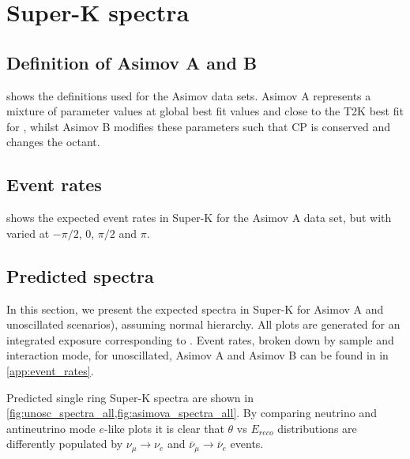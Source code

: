 \section {Super-K spectra}
\label{sec:spectra}

\subsection{Definition of Asimov A and B}
\label{sec:asimov_definition}
 shows the definitions used for the Asimov data sets. Asimov A represents a mixture of parameter values at global best fit values and close to the T2K best fit for \PrevRunPeriod, whilst Asimov B modifies these parameters such that CP is conserved and changes the \ssqthtwothree octant.


\subsection{Event rates}
\label{sec:event_rates}
 shows the expected event rates in Super-K for the Asimov A data set, but with \deltacp varied at $-\pi/2$, 0, $\pi/2$ and $\pi$.


\subsection{Predicted spectra}
\label{sec:selection:predicted_spectra}

In this section, we present the expected spectra in Super-K for Asimov A and unoscillated scenarios), assuming normal hierarchy. All plots are generated for an integrated exposure corresponding to \RunPeriod. Event rates, broken down by sample and interaction mode, for unoscillated, Asimov A and Asimov B can be found in  in \cref{app:event_rates}.

Predicted single ring Super-K spectra are shown in \cref{fig:unosc_spectra_all,fig:asimova_spectra_all}. 
By comparing neutrino and antineutrino mode $e$-like plots it is clear that $\theta$ vs $E_{reco}$ distributions are differently populated by $\nu_{\mu} \rightarrow \nu_e$ and $\bar{\nu}_{\mu} \rightarrow \bar{\nu}_e$ events.


